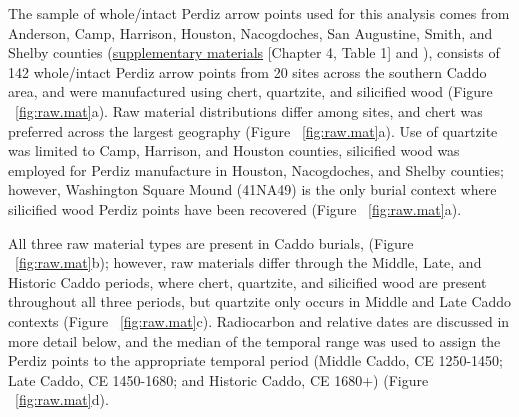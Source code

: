 \documentclass[review]{elsarticle}
\begin{document}
The sample of whole/intact Perdiz arrow points used for this analysis comes from Anderson, Camp, Harrison, Houston, Nacogdoches, San Augustine, Smith, and Shelby counties (\href{https://aksel-blaise.github.io/perdiz/spatial.html}{supplementary materials} [Chapter 4, Table 1] and \citealt{RN8980}), consists of 142 whole/intact Perdiz arrow points from 20 sites across the southern Caddo area, and were manufactured using chert, quartzite, and silicified wood (Figure ~\ref{fig:raw.mat}a). Raw material distributions differ among sites, and chert was preferred across the largest geography (Figure ~\ref{fig:raw.mat}a). Use of quartzite was limited to Camp, Harrison, and Houston counties, silicified wood was employed for Perdiz manufacture in Houston, Nacogdoches, and Shelby counties; however, Washington Square Mound (41NA49) is the only burial context where silicified wood Perdiz points have been recovered (Figure ~\ref{fig:raw.mat}a).

All three raw material types are present in Caddo burials, (Figure ~\ref{fig:raw.mat}b); however, raw materials differ through the Middle, Late, and Historic Caddo periods, where chert, quartzite, and silicified wood are present throughout all three periods, but quartzite only occurs in Middle and Late Caddo contexts (Figure ~\ref{fig:raw.mat}c). Radiocarbon and relative dates are discussed in more detail below, and the median of the temporal range was used to assign the Perdiz points to the appropriate temporal period (Middle Caddo, CE 1250-1450; Late Caddo, CE 1450-1680; and Historic Caddo, CE 1680+) (Figure ~\ref{fig:raw.mat}d).
\end{document}
